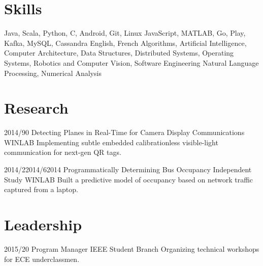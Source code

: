 \documentclass[11pt,letterpaper]{moderncv}
\begin{document}
\section{Skills}
       {Java, Scala, Python, C, Android, Git, Linux}
       {JavaScript, MATLAB, Go, Play, Kafka, MySQL, Cassandra}
       {English, French}
       {Algorithms, Artificial Intelligence, Computer Architecture, Data Structures, Distributed Systems, Operating Systems, Robotics and Computer Vision, Software Engineering}
       {Natural Language Processing, Numerical Analysis}

\section{Research}
    \tlcventry
        {2014/9}{0}
        {Detecting Planes in Real-Time for Camera Display Communications}
        {}
        {}
        {WINLAB}
        {Implementing subtle embedded calibrationless visible-light communication for next-gen QR tags.}

    \tllabelcventry
        {2014/2}{2014/6}{2014}
        {Programmatically Determining Bus Occupancy}
        {Independent Study}
        {}
        {WINLAB}
        {Built a predictive model of occupancy based on network traffic captured from a laptop.}

\section{Leadership}
\tlcventry
        {2015/2}{0}
        {Program Manager}
        {}
        {IEEE Student Branch}
        {}
        {Organizing technical workshops for ECE underclassmen.}
\end{document}
